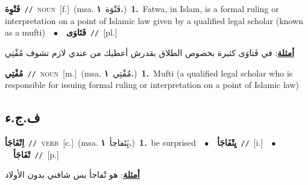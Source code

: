\documentclass[10pt,a4paper,twoside]{article} %
\begin{document}
\begin{multicols}{2}
{{{{{{{{\setlength\topsep{0pt}\textbf{\foreignlanguage{arabic}{فَتْوِة}}\ {\color{gray}\texttt{//}\color{black}}\ \textsc{noun}\ [f.]\ \color{gray}(msa. \foreignlanguage{arabic}{فَتْوَة}~\foreignlanguage{arabic}{\textbf{١.}})\color{black}\ \textbf{1.}~Fatwa, in Islam, is a formal ruling or interpretation on a point of Islamic law given by a qualified legal scholar (known as a mufti)\ \ $\bullet$\ \ \setlength\topsep{0pt}\textbf{\foreignlanguage{arabic}{فَتَاوَى}}\ {\color{gray}\texttt{//}\color{black}}\ [pl.]\  \begin{flushright}\color{gray}\foreignlanguage{arabic}{\textbf{\underline{\foreignlanguage{arabic}{أمثلة}}}: في فَتاوَى كثيرة بخصوص الطلاق بقدرش أعطيك من عندي لازم تشوف مُفْتِي}\end{flushright}\color{black}} \vspace{2mm}

{\setlength\topsep{0pt}\textbf{\foreignlanguage{arabic}{مُفْتِي}}\ {\color{gray}\texttt{//}\color{black}}\ \textsc{noun}\ [m.]\ \color{gray}(msa. \foreignlanguage{arabic}{مُفْتِي}~\foreignlanguage{arabic}{\textbf{١.}})\color{black}\ \textbf{1.}~Mufti (a qualified legal scholar who is responsible for issuing formal ruling or interpretation on a point of Islamic law)\ 

\vspace{-3mm}
\subsection*{\color{blue}\foreignlanguage{arabic}{ف.ج.ء}\color{blue}{}} 

{\setlength\topsep{0pt}\textbf{\foreignlanguage{arabic}{اِتْفَاجَأ}}\ {\color{gray}\texttt{//}\color{black}}\ \textsc{verb}\ [c.]\ \color{gray}(msa. \foreignlanguage{arabic}{يَِتَفاجأ}~\foreignlanguage{arabic}{\textbf{١.}})\color{black}\ \textbf{1.}~be surprised\ \ $\bullet$\ \ \setlength\topsep{0pt}\textbf{\foreignlanguage{arabic}{يِتْفَاجَأ}}\ {\color{gray}\texttt{//}\color{black}}\ [i.]\ \ $\bullet$\ \ \setlength\topsep{0pt}\textbf{\foreignlanguage{arabic}{تْفَاجَأ}}\ {\color{gray}\texttt{//}\color{black}}\ [p.]\  \begin{flushright}\color{gray}\foreignlanguage{arabic}{\textbf{\underline{\foreignlanguage{arabic}{أمثلة}}}: هو تْفاجأ بس شافني بدون الأولاد}\end{flushright}\color{black}} \vspace{2mm}

}}}}}}}}
\end{multicols}
\end{document}
